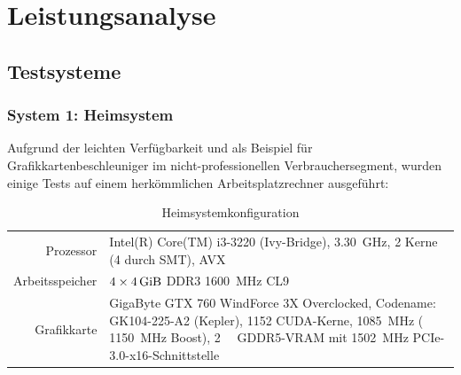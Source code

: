 \chapter{Leistungsanalyse}
\label{sct:benchmarks}




\section{Testsysteme}


\subsection{System 1: Heimsystem}
\label{sct:system1}


Aufgrund der leichten Verfügbarkeit und als Beispiel für Grafikkartenbeschleuniger im nicht-professionellen Verbrauchersegment, wurden einige Tests auf einem herkömmlichen Arbeitsplatzrechner ausgeführt:

\begin{table}[H]
	\begin{center}\begin{tabularx}{0.9\linewidth}{r|X}
	Prozessor & Intel(R) Core(TM) i3-3220 (Ivy-Bridge), \SI{3.30}{\giga\hertz}, 2 Kerne (4 durch SMT), AVX\cite{ark3220} \\
	Arbeitsspeicher & $4\times \SI{4}{\gibi\byte}$ DDR3 \SI{1600}{\mega\hertz} CL9\cite{corsair4gbddr3}\\
	\hline
	Grafikkarte & GigaByte GTX 760 WindForce 3X Overclocked, Codename: GK104-225-A2 (Kepler), 1152 CUDA-Kerne, \SI{1085}{\mega\hertz} ( \SI{1150}{\mega\hertz} Boost), \SI{2}{\gibi\byte} GDDR5-VRAM mit \SI{1502}{\mega\hertz} PCIe-3.0-x16-Schnittstelle\cite{gigabytegtx760,gtx760,nvidiakepler}
	\end{tabularx}\end{center}
	\caption{Heimsystemkonfiguration}
\end{table}

